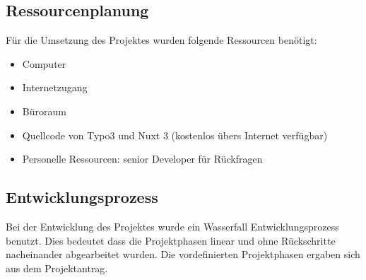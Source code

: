 \subsection{Ressourcenplanung}
\label{sec:Ressourcenplanung}

Für die Umsetzung des Projektes wurden folgende Ressourcen benötigt:
\begin{itemize}
	\item Computer
	\item Internetzugang
	\item Büroraum
	\item Quellcode von Typo3 und Nuxt 3 (kostenlos übers Internet verfügbar)
	\item Personelle Ressourcen: senior Developer für Rückfragen
\end{itemize}

\subsection{Entwicklungsprozess}
\label{sec:Entwicklungsprozess}

Bei der Entwicklung des Projektes wurde ein Wasserfall Entwicklungsprozess benutzt. Dies bedeutet dass die Projektphasen linear und ohne Rückschritte nacheinander abgearbeitet wurden. Die vordefinierten Projektphasen ergaben sich aus dem Projektantrag.
